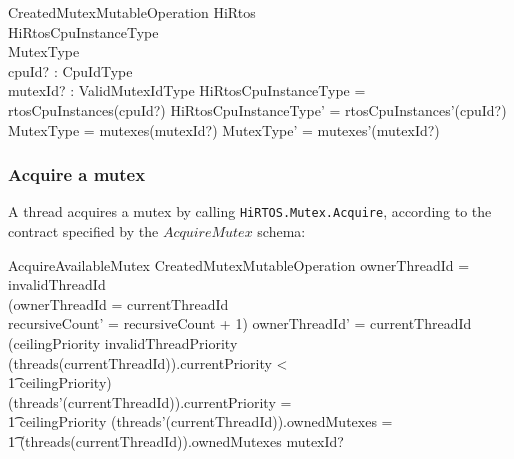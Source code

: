 \documentclass[11pt,letterpaper,twoside,openany]{book}
\begin{document}
\begin{schema}{CreatedMutexMutableOperation}
   \Delta HiRtos \\
   \Delta HiRtosCpuInstanceType \\
   \Delta MutexType \\
   cpuId? : CpuIdType \\
   mutexId? : ValidMutexIdType
\where
   \theta HiRtosCpuInstanceType = rtosCpuInstances(cpuId?)
\also
   \theta HiRtosCpuInstanceType' = rtosCpuInstances'(cpuId?)
\also
   \theta MutexType = mutexes(mutexId?)
\also
   \theta MutexType' = mutexes'(mutexId?)
\end{schema}

\subsubsection{Acquire a mutex}

A thread acquires a mutex by calling \verb`HiRTOS.Mutex.Acquire`, according to the contract
specified by the $AcquireMutex$ schema:

\begin{schema}{AcquireAvailableMutex}
   CreatedMutexMutableOperation
\where
   ownerThreadId = invalidThreadId \lor \\
   (ownerThreadId = currentThreadId \implies \\
    recursiveCount' = recursiveCount + 1)
\also
   ownerThreadId' = currentThreadId
\also
(ceilingPriority \neq invalidThreadPriority \land \\
 (threads(currentThreadId)).currentPriority < \\
 \t1    ceilingPriority) \implies \\
 (threads'(currentThreadId)).currentPriority = \\
 \t1    ceilingPriority
\also
(threads'(currentThreadId)).ownedMutexes = \\
\t1 (threads(currentThreadId)).ownedMutexes \cat \langle mutexId? \rangle
\end{schema}
\end{document}

